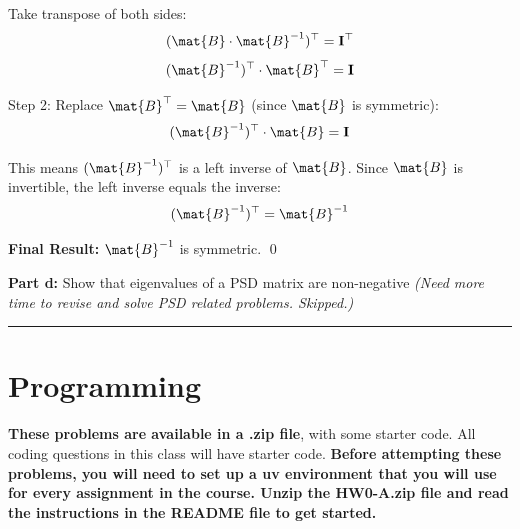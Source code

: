 \documentclass{article}
\begin{document}
\begin{aprob}
    Take transpose of both sides:
    \[
        (\mat{B} \cdot \mat{B}^{-1})^\top = \mathbf{I}^\top
    \]
    \[
        (\mat{B}^{-1})^\top \cdot \mat{B}^\top = \mathbf{I}
    \]

    Step 2: Replace $\mat{B}^\top = \mat{B}$ (since $\mat{B}$ is symmetric):
    \[
        (\mat{B}^{-1})^\top \cdot \mat{B} = \mathbf{I}
    \]

    This means $(\mat{B}^{-1})^\top$ is a left inverse of $\mat{B}$. Since $\mat{B}$ is invertible, the left inverse equals the inverse:
    \[
        (\mat{B}^{-1})^\top = \mat{B}^{-1}
    \]

    \textbf{Final Result:} $\mat{B}^{-1}$ is symmetric. \qed

    \bigskip
    \begin{mdframed}
    \textbf{\large Part d:} Show that eigenvalues of a PSD matrix are non-negative \hfill \textit{(Need more time to revise and solve PSD related problems. Skipped.)}
    \end{mdframed}

\end{aprob}

\noindent\rule{\textwidth}{0.4pt}

\clearpage{}
\section*{Programming}
\textbf{These problems are available in a .zip file}, with some starter code. All coding questions in this class will have starter code.
\textbf{Before attempting these problems, you will need to set up a uv environment that you will use for every assignment in the course. Unzip the HW0-A.zip file and read the instructions in the README file to get started.}
\end{document}
